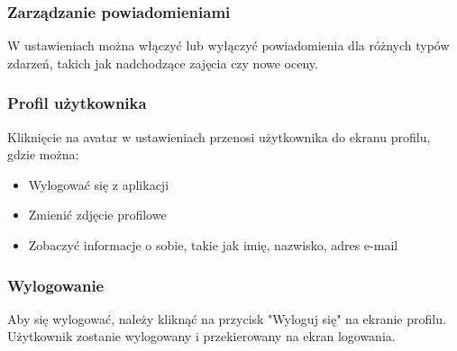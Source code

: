\subsubsection{Zarządzanie powiadomieniami}

W ustawieniach można włączyć lub wyłączyć powiadomienia dla różnych typów zdarzeń, takich jak nadchodzące zajęcia czy nowe oceny.


\subsubsection{Profil użytkownika}

Kliknięcie na avatar w ustawieniach przenosi użytkownika do ekranu profilu, gdzie można:

\begin{itemize}
  \item Wylogować się z aplikacji
  \item Zmienić zdjęcie profilowe
  \item Zobaczyć informacje o sobie, takie jak imię, nazwisko, adres e-mail
\end{itemize}


\subsubsection{Wylogowanie}

Aby się wylogować, należy kliknąć na przycisk "Wyloguj się" na ekranie profilu. Użytkownik zostanie wylogowany i przekierowany na ekran logowania.

